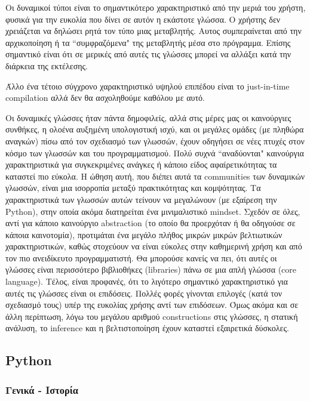 Οι δυναμικοί τύποι είναι το σημαντικότερο χαρακτηριστικό από την μεριά του
χρήστη, φυσικά για την ευκολία που δίνει σε αυτόν η εκάστοτε γλώσσα. Ο χρήστης
δεν χρειάζεται να δηλώσει ρητά τον τύπο μιας μεταβλητής. Αυτος συμπεραίνεται από
την αρχικοποίηση ή τα ``συμφραζόμενα" της μεταβλητής μέσα στο πρόγραμμα. Επίσης
σημαντικό είναι ότι σε μερικές από αυτές τις γλώσσες μπορεί να αλλάξει κατά την
διάρκεια της εκτέλεσης.

Άλλο ένα τέτοιο σύγχρονο χαρακτηριστικό υψηλού επιπέδου είναι το just-in-time
compilation αλλά δεν θα ασχοληθούμε καθόλου με αυτό.

Οι δυναμικές γλώσσες ήταν πάντα δημοφιλείς, αλλά στις μέρες μας οι καινούργιες
συνθήκες, η ολοένα αυξημένη υπολογιστική ισχύ, και οι μεγάλες ομάδες (με πληθώρα
αναγκών) πίσω από τον σχεδιασμό των γλωσσών, έχουν οδηγήσει σε νέες  πτυχές στον
κόσμο των γλωσσών και του προγραμματισμού. Πολύ συχνά ``αναδύονται" καινούργια
χαρακτηριστικά για συγκεκριμένες ανάγκες ή κάποιο είδος  αφαίρετικότητας τα
καταστεί πιο εύκολα. Η ώθηση αυτή, που διέπει αυτά τα  communities των δυναμικών
γλωσσών, είναι μια ισορροπία μεταξύ πρακτικότητας και κομψότητας. Τα
χαρακτηριστικά των γλωσσών αυτών τείνουν να μεγαλώνουν (με  εξαίρεση την
Python), στην οποία ακόμα διατηρείται ένα μινιμαλιστικό mindset. Σχεδόν σε όλες,
αντί για κάποιο καινούργιο abstraction (το οποίο θα προερχόταν  ή θα οδηγούσε σε
κάποια καινοτομία), προτιμάται ένα μεγάλο πλήθος μικρών μικρών  βελτιωτικών
χαρακτηριστικών, καθώς στοχεύουν να είναι εύκολες στην καθημερινή  χρήση και από
τον πιο ανειδίκευτο προγραμματιστή. Θα μπορούσε κανείς να πει,  ότι αυτές οι
γλώσσες είναι περισσότερο βιβλιοθήκες (libraries) πάνω σε μια απλή  γλώσσα (core
language). Τέλος, είναι προφανές, ότι το λιγότερο σημαντικό  χαρακτηριστικό για
αυτές τις γλώσσες είναι οι επιδόσεις. Πολλές φορές γίνονται  επιλογές (κατά τον
σχεδιασμό τους) υπέρ της ευκολίας χρήσης αντί των επιδόσεων. Όμως ακόμα και σε
άλλη περίπτωση, λόγω του μεγάλου αριθμού constructions στις  γλώσσες, η στατική
ανάλυση, το inference και η βελτιστοποίηση έχουν καταστεί  εξαιρετικά δύσκολες.


\subsection{Python}

\subsubsection{Γενικά - Ιστορία}


